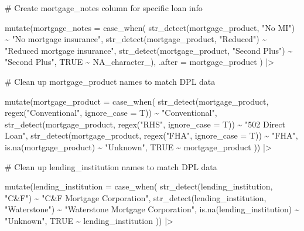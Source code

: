 \documentclass[
  letterpaper,
  DIV=11,
  numbers=noendperiod]{scrartcl}
\newenvironment{Shaded}{\begin{snugshade}}{\end{snugshade}}
\newcommand{\AttributeTok}[1]{\textcolor[rgb]{0.40,0.45,0.13}{#1}}
\newcommand{\CommentTok}[1]{\textcolor[rgb]{0.37,0.37,0.37}{#1}}
\newcommand{\ConstantTok}[1]{\textcolor[rgb]{0.56,0.35,0.01}{#1}}
\newcommand{\FunctionTok}[1]{\textcolor[rgb]{0.28,0.35,0.67}{#1}}
\newcommand{\NormalTok}[1]{\textcolor[rgb]{0.00,0.23,0.31}{#1}}
\newcommand{\SpecialCharTok}[1]{\textcolor[rgb]{0.37,0.37,0.37}{#1}}
\newcommand{\StringTok}[1]{\textcolor[rgb]{0.13,0.47,0.30}{#1}}
\begin{document}
\begin{Shaded}
\begin{Highlighting}[]
  \CommentTok{\# Create mortgage\_notes column for specific loan info}
  
  \FunctionTok{mutate}\NormalTok{(}\AttributeTok{mortgage\_notes =} \FunctionTok{case\_when}\NormalTok{(}
    \FunctionTok{str\_detect}\NormalTok{(mortgage\_product, }\StringTok{"No MI"}\NormalTok{) }\SpecialCharTok{\textasciitilde{}} \StringTok{"No mortgage insurance"}\NormalTok{,}
    \FunctionTok{str\_detect}\NormalTok{(mortgage\_product, }\StringTok{"Reduced"}\NormalTok{) }\SpecialCharTok{\textasciitilde{}} \StringTok{"Reduced mortgage insurance"}\NormalTok{,}
    \FunctionTok{str\_detect}\NormalTok{(mortgage\_product, }\StringTok{"Second Plus"}\NormalTok{) }\SpecialCharTok{\textasciitilde{}} \StringTok{"Second Plus"}\NormalTok{,}
    \ConstantTok{TRUE} \SpecialCharTok{\textasciitilde{}} \ConstantTok{NA\_character\_}\NormalTok{),}
    \AttributeTok{.after =}\NormalTok{ mortgage\_product}
\NormalTok{    ) }\SpecialCharTok{|\textgreater{}} 
  
  \CommentTok{\# Clean up mortgage\_product names to match DPL data}
  
  \FunctionTok{mutate}\NormalTok{(}\AttributeTok{mortgage\_product =} \FunctionTok{case\_when}\NormalTok{(}
    \FunctionTok{str\_detect}\NormalTok{(mortgage\_product, }\FunctionTok{regex}\NormalTok{(}\StringTok{"Conventional"}\NormalTok{, }\AttributeTok{ignore\_case =}\NormalTok{ T)) }\SpecialCharTok{\textasciitilde{}} \StringTok{"Conventional"}\NormalTok{,}
    \FunctionTok{str\_detect}\NormalTok{(mortgage\_product, }\FunctionTok{regex}\NormalTok{(}\StringTok{"RHS"}\NormalTok{, }\AttributeTok{ignore\_case =}\NormalTok{ T)) }\SpecialCharTok{\textasciitilde{}} \StringTok{"502 Direct Loan"}\NormalTok{,}
    \FunctionTok{str\_detect}\NormalTok{(mortgage\_product, }\FunctionTok{regex}\NormalTok{(}\StringTok{"FHA"}\NormalTok{, }\AttributeTok{ignore\_case =}\NormalTok{ T)) }\SpecialCharTok{\textasciitilde{}} \StringTok{"FHA"}\NormalTok{,}
    \FunctionTok{is.na}\NormalTok{(mortgage\_product) }\SpecialCharTok{\textasciitilde{}} \StringTok{"Unknown"}\NormalTok{,}
    \ConstantTok{TRUE} \SpecialCharTok{\textasciitilde{}}\NormalTok{ mortgage\_product}
\NormalTok{  )) }\SpecialCharTok{|\textgreater{}} 
  
  \CommentTok{\# Clean up lending\_institution names to match DPL data}

  \FunctionTok{mutate}\NormalTok{(}\AttributeTok{lending\_institution =} \FunctionTok{case\_when}\NormalTok{(}
    \FunctionTok{str\_detect}\NormalTok{(lending\_institution, }\StringTok{"C\&F"}\NormalTok{) }\SpecialCharTok{\textasciitilde{}} \StringTok{"C\&F Mortgage Corporation"}\NormalTok{,}
    \FunctionTok{str\_detect}\NormalTok{(lending\_institution, }\StringTok{"Waterstone"}\NormalTok{) }\SpecialCharTok{\textasciitilde{}} \StringTok{"Waterstone Mortgage Corporation"}\NormalTok{,}
    \FunctionTok{is.na}\NormalTok{(lending\_institution) }\SpecialCharTok{\textasciitilde{}} \StringTok{"Unknown"}\NormalTok{,}
    \ConstantTok{TRUE} \SpecialCharTok{\textasciitilde{}}\NormalTok{ lending\_institution}
\NormalTok{  )) }\SpecialCharTok{|\textgreater{}} 
  

\end{Highlighting}
\end{Shaded}
\end{document}
